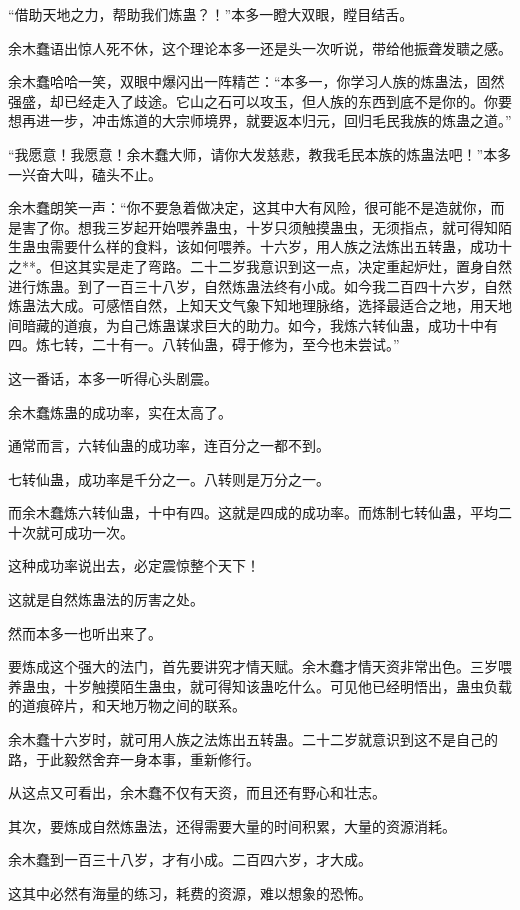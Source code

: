 \begin{this_body}
“借助天地之力，帮助我们炼蛊？！”本多一瞪大双眼，瞠目结舌。

余木蠢语出惊人死不休，这个理论本多一还是头一次听说，带给他振聋发聩之感。

余木蠢哈哈一笑，双眼中爆闪出一阵精芒：“本多一，你学习人族的炼蛊法，固然强盛，却已经走入了歧途。它山之石可以攻玉，但人族的东西到底不是你的。你要想再进一步，冲击炼道的大宗师境界，就要返本归元，回归毛民我族的炼蛊之道。”

“我愿意！我愿意！余木蠢大师，请你大发慈悲，教我毛民本族的炼蛊法吧！”本多一兴奋大叫，磕头不止。

余木蠢朗笑一声：“你不要急着做决定，这其中大有风险，很可能不是造就你，而是害了你。想我三岁起开始喂养蛊虫，十岁只须触摸蛊虫，无须指点，就可得知陌生蛊虫需要什么样的食料，该如何喂养。十六岁，用人族之法炼出五转蛊，成功十之**。但这其实是走了弯路。二十二岁我意识到这一点，决定重起炉灶，置身自然进行炼蛊。到了一百三十八岁，自然炼蛊法终有小成。如今我二百四十六岁，自然炼蛊法大成。可感悟自然，上知天文气象下知地理脉络，选择最适合之地，用天地间暗藏的道痕，为自己炼蛊谋求巨大的助力。如今，我炼六转仙蛊，成功十中有四。炼七转，二十有一。八转仙蛊，碍于修为，至今也未尝试。”

这一番话，本多一听得心头剧震。

余木蠢炼蛊的成功率，实在太高了。

通常而言，六转仙蛊的成功率，连百分之一都不到。

七转仙蛊，成功率是千分之一。八转则是万分之一。

而余木蠢炼六转仙蛊，十中有四。这就是四成的成功率。而炼制七转仙蛊，平均二十次就可成功一次。

这种成功率说出去，必定震惊整个天下！

这就是自然炼蛊法的厉害之处。

然而本多一也听出来了。

要炼成这个强大的法门，首先要讲究才情天赋。余木蠢才情天资非常出色。三岁喂养蛊虫，十岁触摸陌生蛊虫，就可得知该蛊吃什么。可见他已经明悟出，蛊虫负载的道痕碎片，和天地万物之间的联系。

余木蠢十六岁时，就可用人族之法炼出五转蛊。二十二岁就意识到这不是自己的路，于此毅然舍弃一身本事，重新修行。

从这点又可看出，余木蠢不仅有天资，而且还有野心和壮志。

其次，要炼成自然炼蛊法，还得需要大量的时间积累，大量的资源消耗。

余木蠢到一百三十八岁，才有小成。二百四六岁，才大成。

这其中必然有海量的练习，耗费的资源，难以想象的恐怖。


\end{this_body}
